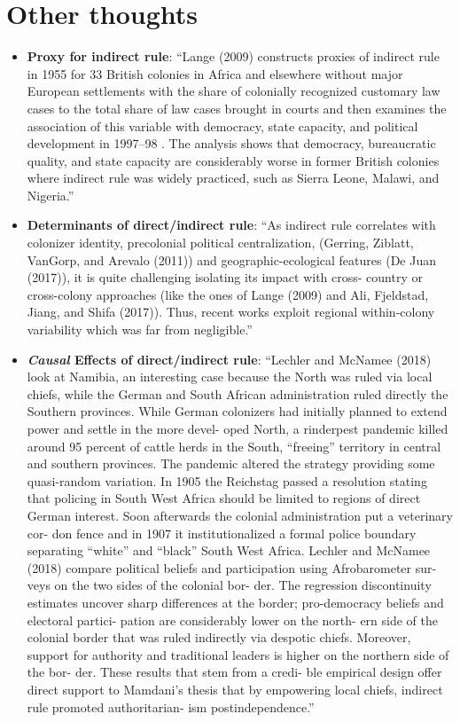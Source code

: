 \documentclass[11pt,a4paper]{article}
\begin{document}
	\clearpage
	\section{Other thoughts}
	\begin{itemize}
		\item \textbf{Proxy for indirect rule}: ``Lange (2009) constructs proxies of indirect	rule in 1955 for 33 British colonies in Africa and elsewhere without major European settlements with the share of colonially recognized customary law cases to the total share of law cases brought in courts and then examines the association of this variable with democracy, state capacity, and political development in 1997–98 . The analysis shows that democracy, bureaucratic quality, and state capacity are considerably worse in former British colonies where indirect rule was widely practiced, such as Sierra Leone, Malawi, and Nigeria.'' \parencite[61]{Michalopoulos2020}
		\item \textbf{Determinants of direct/indirect rule}: ``As indirect rule correlates with colonizer identity, precolonial political centralization, (Gerring, Ziblatt, VanGorp, and Arevalo (2011)) and geographic-ecological features (De Juan (2017)), it is quite challenging isolating its impact with cross- country or cross-colony approaches (like the ones of Lange (2009) and Ali, Fjeldstad, Jiang, and Shifa (2017)). Thus, recent works exploit regional within-colony variability which was far from negligible.'' \parencite[63]{Michalopoulos2020}
		\item \textbf{\emph{Causal} Effects of direct/indirect rule}: ``Lechler and McNamee (2018) look at Namibia, an interesting case because the North was ruled via local chiefs, while the German and South African administration ruled directly the Southern provinces. While German colonizers had initially planned to extend power and settle in the more devel- oped North, a rinderpest pandemic killed around 95 percent of cattle herds in the South, “freeing” territory in central and southern provinces. The pandemic altered the strategy providing some quasi-random variation. In 1905 the Reichstag passed a resolution stating that policing in South West Africa should be limited to regions of direct German interest. Soon afterwards the colonial administration put a veterinary cor- don fence and in 1907 it institutionalized a formal police boundary separating “white” and “black” South West Africa. Lechler and McNamee (2018) compare political beliefs and participation using Afrobarometer sur- veys on the two sides of the colonial bor- der. The regression discontinuity estimates uncover sharp differences at the border; pro-democracy beliefs and electoral partici- pation are considerably lower on the north- ern side of the colonial border that was ruled indirectly via despotic chiefs. Moreover, support for authority and traditional leaders is higher on the northern side of the bor- der. These results that stem from a credi- ble empirical design offer direct support to Mamdani’s thesis that by empowering local chiefs, indirect rule promoted authoritarian- ism postindependence.'' \parencite[64]{Michalopoulos2020}

\end{itemize}
\end{document}
